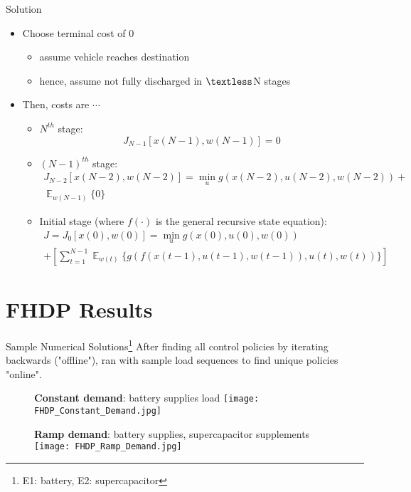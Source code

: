 \documentclass{beamer}
\DeclareMathOperator{\E}{\mathbb{E}}
\begin{document}
\begin{frame}{Solution}
\begin{itemize}
	\item Choose terminal cost of 0
	 \begin{itemize}
		\item assume vehicle reaches destination
		\item hence, assume not fully discharged in $\textless$N stages
	 \end{itemize}
	\item Then, costs are $\cdots$
	 \begin{itemize}
		\item $N^{th}$ stage:
		\begin{equation}
		J_{N-1}[x(N-1),w(N-1)]=0
		\end{equation}		
		\item $(N-1)^{th}$ stage: \\
		\begin{multline}
		J_{N-2}[x(N-2),w(N-2)]=\min_{u} g(x(N-2),u(N-2),w(N-2))+\\ \mathop{\E}_{w(N-1)}\{0\}
		\end{multline}
		\item Initial stage (where $f(\cdot)$ is the general recursive state equation): \\	
		\begin{multline}
		J=J_{0}[x(0),w(0)]=\min_{u} g(x(0),u(0),w(0))\\
		+\left[\sum_{t=1}^{N-1}\mathop{\E}_{w(t)} \{
		g( f(x(t-1),u(t-1),w(t-1)) ,u(t),w(t))
		\}\right]
		\end{multline}
	 \end{itemize}
\end{itemize}
\end{frame}

\section{FHDP Results}
\begin{frame}{Sample Numerical Solutions\footnote{E1: battery, E2: supercapacitor}}
After finding all control policies by iterating backwards ("offline"), ran with sample load sequences to find unique policies "online".\newline\newline

	\begin{minipage}{0.5\textwidth}
		\begin{figure}
			\textbf{Constant demand}: battery supplies load
		 	\texttt{[image: FHDP\_Constant\_Demand.jpg]}
		\end{figure}
	\end{minipage}\begin{minipage}{0.5\textwidth}
		\begin{figure}
			\textbf{Ramp demand}: battery supplies, supercapacitor supplements
			\texttt{[image: FHDP\_Ramp\_Demand.jpg]}
		\end{figure}
 	\end{minipage}
 		
\end{frame}
\end{document}
